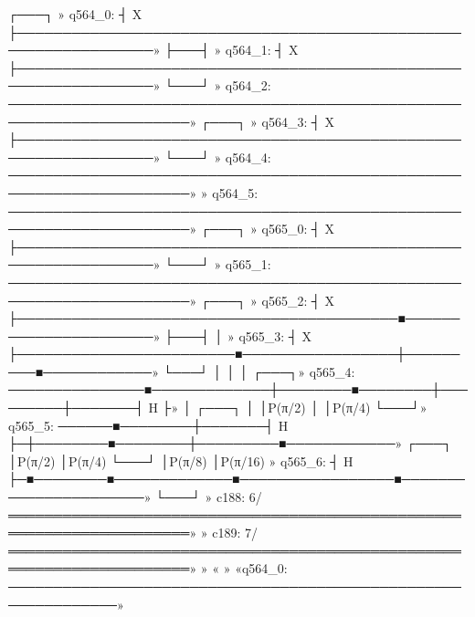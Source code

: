         ┌───┐                                                                 »
q564_0: ┤ X ├─────────────────────────────────────────────────────────────────»
        ├───┤                                                                 »
q564_1: ┤ X ├─────────────────────────────────────────────────────────────────»
        └───┘                                                                 »
q564_2: ──────────────────────────────────────────────────────────────────────»
        ┌───┐                                                                 »
q564_3: ┤ X ├─────────────────────────────────────────────────────────────────»
        └───┘                                                                 »
q564_4: ──────────────────────────────────────────────────────────────────────»
                                                                              »
q564_5: ──────────────────────────────────────────────────────────────────────»
        ┌───┐                                                                 »
q565_0: ┤ X ├─────────────────────────────────────────────────────────────────»
        └───┘                                                                 »
q565_1: ──────────────────────────────────────────────────────────────────────»
        ┌───┐                                                                 »
q565_2: ┤ X ├──────────────────────────────────────────■──────────────────────»
        ├───┤                                          │                      »
q565_3: ┤ X ├────────────────────────■─────────────────┼─────────■────────────»
        └───┘                        │                 │         │       ┌───┐»
q565_4: ───────────────■─────────────┼────────■────────┼─────────┼───────┤ H ├»
                       │       ┌───┐ │        │P(π/2)  │         │P(π/4) └───┘»
q565_5: ──────■────────┼───────┤ H ├─┼────────■────────┼─────────■────────────»
        ┌───┐ │P(π/2)  │P(π/4) └───┘ │P(π/8)           │P(π/16)               »
q565_6: ┤ H ├─■────────■─────────────■─────────────────■──────────────────────»
        └───┘                                                                 »
c188: 6/══════════════════════════════════════════════════════════════════════»
                                                                              »
c189: 7/══════════════════════════════════════════════════════════════════════»
                                                                              »
«                                                                      »
«q564_0: ──────────────────────────────────────────────────────────────»
